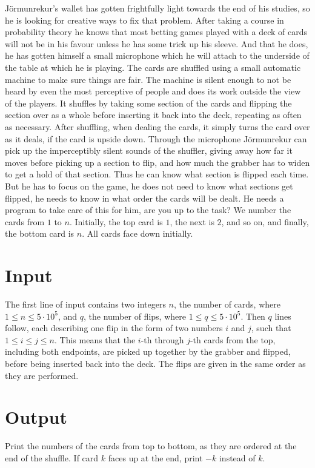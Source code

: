 
Jörmunrekur's wallet has gotten frightfully light towards the end of his studies, so he is looking for creative ways
to fix that problem. After taking a course in probability theory he knows that most betting games played with a deck of cards will not be in his favour
unless he has some trick up his sleeve. And that he does, he has gotten himself a small microphone which he will attach to
the underside of the table at which he is playing. The cards are shuffled using a small automatic machine to make sure things
are fair. The machine is silent enough to not be heard by even the most perceptive of people and does its work outside the view
of the players. It shuffles by taking some section of the cards and flipping the section over as a whole before inserting it back into the deck, repeating as often as necessary.
After shuffling, when dealing the cards, it simply turns the card over as it deals, if the card is upside down. Through the microphone
Jörmunrekur can pick up the imperceptibly silent sounds of the shuffler, giving away how far it moves before picking up
a section to flip, and how much the grabber has to widen to get a hold of that section. Thus he can know what section
is flipped each time. But he has to focus on the game, he does not need to know what sections get flipped, he needs to
know in what order the cards will be dealt. He needs a program to take care of this for him, are you up to the task?
We number the cards from $1$ to $n$.
Initially, the top card is $1$, the next is $2$, and so on, and finally, the bottom card is $n$.
All cards face down initially.

\section*{Input}
The first line of input contains two integers $n$, the number of cards, where $1 \leq n \leq 5 \cdot 10^5$, and $q$, the number of flips, where $1 \leq q \leq 5 \cdot 10^5$. Then $q$ lines follow, each describing one flip in the form of two numbers $i$ and $j$, such that $1 \leq i \leq j \leq n$. This means that the $i$-th through $j$-th cards from the top, including both endpoints, are picked up together by the grabber and flipped, before being inserted back into the deck.
The flips are given in the same order as they are performed.

\section*{Output}
Print the numbers of the cards from top to bottom, as they are ordered at the end of the shuffle.
If card $k$ faces up at the end, print $-k$ instead of $k$.


